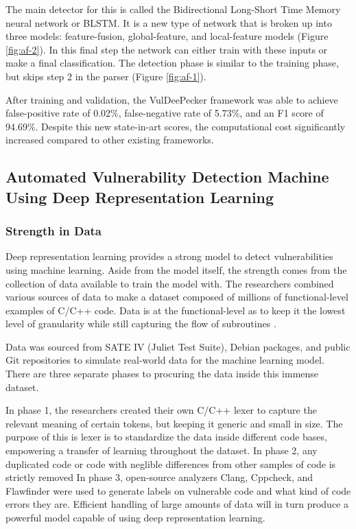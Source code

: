 \documentclass[12pt,twocolumn,letterpaper]{article}
\begin{document}
The main detector for this is called the Bidirectional Long-Short Time Memory neural network or BLSTM. It 
is a new type of network that is broken up into three models: feature-fusion, global-feature, and local-feature 
models (Figure \ref{fig:af-2}). In this final step the network can either train with these inputs or make 
a final classification. The detection phase is similar to the training phase, but skips step 2 in the parser 
(Figure \ref{fig:af-1}). 

After training and validation, the VulDeePecker framework was able to achieve false-positive rate of 
0.02\%, false-negative rate of 5.73\%, and an F1 score of 94.69\%. Despite this new state-in-art scores, 
the computational cost significantly increased compared to other existing frameworks.

\subsection{Automated Vulnerability Detection Machine Using Deep Representation Learning}
\label{sub:automated-vulnerability-detection-machine-using-deep-representation-learning}

\subsubsection{Strength in Data}
Deep representation learning provides a strong model to detect vulnerabilities using machine learning. Aside from the model
itself, the strength comes from the collection of data available to train the model with. The researchers combined various
sources of data to make a dataset composed of millions of functional-level examples of C/C++ code. Data is at the
functional-level as to keep it the lowest level of granularity while still capturing the flow of subroutines \cite{Russell18}.

Data was sourced from SATE IV (Juliet Test Suite), Debian packages, and public Git repositories to simulate real-world data
for the machine learning model. There are three separate phases to procuring the data inside this immense dataset.

In phase 1, the researchers created their own C/C++ lexer to capture the relevant meaning of certain tokens, but keeping it
generic and small in size. The purpose of this is lexer is to standardize the data inside different code bases, empowering a transfer of learning throughout the dataset.
In phase 2, any duplicated code or code with neglible differences from other samples of code is strictly removed
In phase 3, open-source analyzers Clang, Cppcheck, and Flawfinder were used to generate labels on vulnerable code and what kind of code
errors they are.
Efficient handling of large amounts of data will in turn produce a powerful model capable of using deep representation learning.
\end{document}
